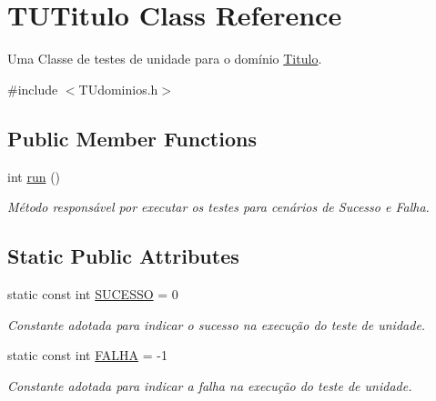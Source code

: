 \hypertarget{classTUTitulo}{}\section{T\+U\+Titulo Class Reference}
\label{classTUTitulo}


Uma Classe de testes de unidade para o domínio \hyperlink{classTitulo}{Titulo}.  




{\ttfamily \#include $<$T\+Udominios.\+h$>$}

\subsection*{Public Member Functions}
\begin{DoxyCompactItemize}
\item 
int \hyperlink{classTUTitulo_a2bf05b935f07f368b03c694d1f8ce8c7}{run} ()
\begin{DoxyCompactList}\small\item\em Método responsável por executar os testes para cenários de Sucesso e Falha. \end{DoxyCompactList}\end{DoxyCompactItemize}
\subsection*{Static Public Attributes}
\begin{DoxyCompactItemize}
\item 
\mbox{\label{classTUTitulo_aaea6696cee40d23798e3777c1e17688f}} 
static const int \hyperlink{classTUTitulo_aaea6696cee40d23798e3777c1e17688f}{S\+U\+C\+E\+S\+SO} = 0
\begin{DoxyCompactList}\small\item\em Constante adotada para indicar o sucesso na execução do teste de unidade. \end{DoxyCompactList}\item 
\mbox{\label{classTUTitulo_a5f60ebb41aa0607f6a7a4b825907b6ee}} 
static const int \hyperlink{classTUTitulo_a5f60ebb41aa0607f6a7a4b825907b6ee}{F\+A\+L\+HA} = -\/1
\begin{DoxyCompactList}\small\item\em Constante adotada para indicar a falha na execução do teste de unidade. \end{DoxyCompactList}\end{DoxyCompactItemize}


